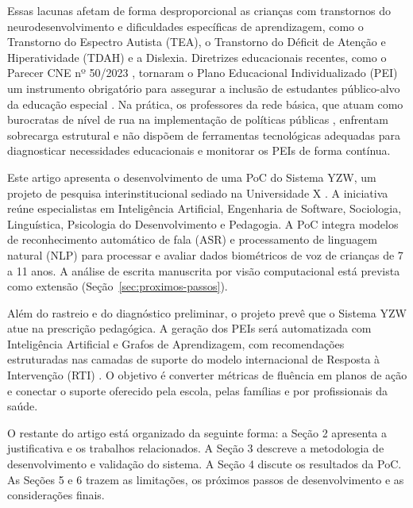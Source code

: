 \documentclass[12pt]{article}
\begin{document}
Essas lacunas afetam de forma desproporcional as crianças com transtornos do neurodesenvolvimento e dificuldades específicas de aprendizagem, como o Transtorno do Espectro Autista (TEA), o Transtorno do Déficit de Atenção e Hiperatividade (TDAH) e a Dislexia. Diretrizes educacionais recentes, como o Parecer CNE nº 50/2023 \cite{cne2023parecer50}, tornaram o Plano Educacional Individualizado (PEI) um instrumento obrigatório para assegurar a inclusão de estudantes público-alvo da educação especial \cite{tannus2018inclusao}. Na prática, os professores da rede básica, que atuam como burocratas de nível de rua na implementação de políticas públicas \cite{bonelli2019atuacao}, enfrentam sobrecarga estrutural e não dispõem de ferramentas tecnológicas adequadas para diagnosticar necessidades educacionais e monitorar os PEIs de forma contínua.

Este artigo apresenta o desenvolvimento de uma PoC do Sistema YZW, um projeto de pesquisa interinstitucional sediado na Universidade X %
. A iniciativa reúne especialistas em Inteligência Artificial, Engenharia de Software, Sociologia, Linguística, Psicologia do Desenvolvimento e Pedagogia. A PoC integra modelos de reconhecimento automático de fala (ASR) e processamento de linguagem natural (NLP) para processar e avaliar dados biométricos de voz de crianças de 7 a 11 anos. A análise de escrita manuscrita por visão computacional está prevista como extensão (Seção~\ref{sec:proximos-passos}).

Além do rastreio e do diagnóstico preliminar, o projeto prevê que o Sistema YZW atue na prescrição pedagógica. A geração dos PEIs será automatizada com Inteligência Artificial e Grafos de Aprendizagem, com recomendações estruturadas nas camadas de suporte do modelo internacional de Resposta à Intervenção (RTI) \cite{batista2019modelo}. O objetivo é converter métricas de fluência em planos de ação e conectar o suporte oferecido pela escola, pelas famílias e por profissionais da saúde.

O restante do artigo está organizado da seguinte forma: a Seção 2 apresenta a justificativa e os trabalhos relacionados. %
A Seção 3 descreve a metodologia de desenvolvimento e validação do sistema. A Seção 4 discute os resultados da PoC. As Seções 5 e 6 trazem as limitações, os próximos passos de desenvolvimento e as considerações finais.

\end{document}

